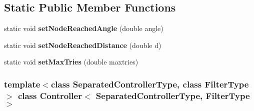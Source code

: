 \subsection*{\-Static \-Public \-Member \-Functions}
\begin{DoxyCompactItemize}
\item 
\hypertarget{class_controller_a665b0a9cab38c11e575681944e2c8d8a}{static void {\bfseries set\-Node\-Reached\-Angle} (double angle)}\label{class_controller_a665b0a9cab38c11e575681944e2c8d8a}

\item 
\hypertarget{class_controller_a5d394a75a6d1cf325fda099b23c91a2f}{static void {\bfseries set\-Node\-Reached\-Distance} (double d)}\label{class_controller_a5d394a75a6d1cf325fda099b23c91a2f}

\item 
\hypertarget{class_controller_a2e27a2fbd5d1c83d918e05da91302863}{static void {\bfseries set\-Max\-Tries} (double maxtries)}\label{class_controller_a2e27a2fbd5d1c83d918e05da91302863}

\end{DoxyCompactItemize}
\subsubsection*{template$<$class \-Separated\-Controller\-Type, class \-Filter\-Type$>$ class Controller$<$ Separated\-Controller\-Type, Filter\-Type $>$}



